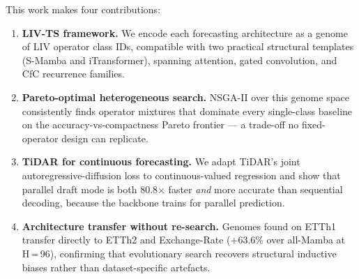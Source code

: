 This work makes four contributions:
\begin{enumerate}
  \item \textbf{LIV-TS framework.}
    We encode each forecasting architecture as a genome of LIV operator class IDs, compatible with two practical structural templates (S-Mamba and iTransformer), spanning attention, gated convolution, and CfC \cite{hasani2022liquid} recurrence families.

  \item \textbf{Pareto-optimal heterogeneous search.}
    NSGA-II over this genome space consistently finds operator mixtures that dominate every single-class baseline on the accuracy-vs-compactness Pareto frontier — a trade-off no fixed-operator design can replicate.

  \item \textbf{TiDAR for continuous forecasting.}
    We adapt TiDAR's joint autoregressive-diffusion loss to continuous-valued regression and show that parallel draft mode is both 80.8$\times$ faster \emph{and} more accurate than sequential decoding, because the backbone trains for parallel prediction.

  \item \textbf{Architecture transfer without re-search.}
    Genomes found on ETTh1 transfer directly to ETTh2 and Exchange-Rate ($+$63.6\% over all-Mamba at H\,=\,96), confirming that evolutionary search recovers structural inductive biases rather than dataset-specific artefacts.
\end{enumerate}
